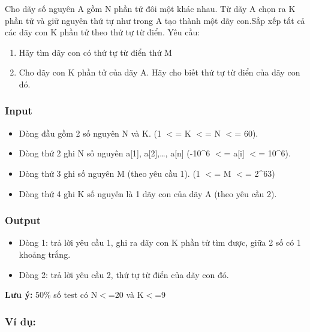 





   Cho dãy số nguyên A gồm N phần tử đôi một khác nhau. Từ dãy A chọn ra K phần tử và giữ nguyên thứ tự như trong A tạo thành một dãy con.Sắp xếp tất cả các dãy con K phần tử theo thứ tự từ điển. Yêu cầu:  
\begin{enumerate}
	\item     Hãy tìm dãy con có thứ tự từ điển thứ M   
	\item     Cho dãy con K phần tử của dãy A. Hãy cho biết thứ tự từ điển của dãy con đó.   
\end{enumerate}

\subsubsection{   Input  }
\begin{itemize}
	\item     Dòng đầu gồm 2 số nguyên N và K. (1 $<$= K $<$= N $<$= 60).   
	\item     Dòng thứ 2 ghi N số nguyên a[1], a[2],…, a[n] (-10\textasciicircum6 $<$= a[i] $<$= 10\textasciicircum6).   
	\item     Dòng thứ 3 ghi số nguyên M (theo yêu cầu 1). (1 $<$= M $<$= 2\textasciicircum63)   
	\item     Dòng thứ 4 ghi K số nguyên là 1 dãy con của dãy A (theo yêu cầu 2).   
\end{itemize}

\subsubsection{   Output  }
\begin{itemize}
	\item 

     Dòng 1: trả lời yêu cầu 1, ghi ra dãy con K phần tử tìm được, giữa 2 số có 1 khoảng trắng.    
	\item     Dòng 2: trả lời yêu cầu 2, thứ tự từ điển của dãy con đó.   
\end{itemize}

\textbf{    Lưu ý:   }   50\% số test có N$<$=20 và K$<$=9  
\begin{itemize}
\end{itemize}

\subsubsection{   Ví dụ:  }


